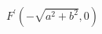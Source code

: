 \documentclass[preview]{standalone}
\begin{document}
\begin{align*}
F^\prime(-\sqrt{a^2+b^2}, 0)
\end{align*}
\end{document}
